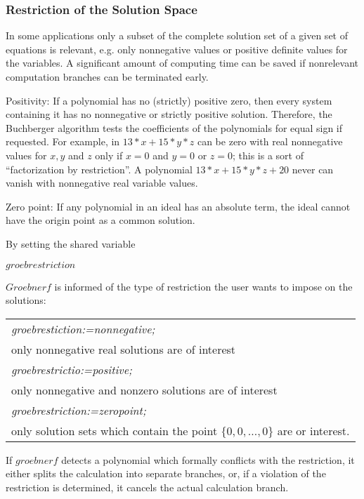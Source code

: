 \subsubsection{Restriction of the Solution Space}
In some applications only a subset of the complete solution set
of a given set of equations is relevant, e.g. only
nonnegative values or positive definite values for the variables.
A significant amount of computing time can be saved if
nonrelevant computation branches can be terminated early.

Positivity: If a polynomial has no (strictly) positive zero, then
every system containing it has no nonnegative or strictly positive
solution. Therefore, the Buchberger algorithm tests the coefficients of
the polynomials for equal sign if requested. For example, in $13*x +
15*y*z $ can be zero with real nonnegative values for $x, y$ and $z$
only if $x=0$ and $y=0$ or $ z=0$; this is a sort of ``factorization by
restriction''. A polynomial $13*x + 15*y*z + 20$ never can vanish
with nonnegative real variable values.

Zero point:  If any polynomial in an ideal has an absolute term, the ideal
cannot have the origin point as a common solution.

By setting the shared variable
\begin{center} $groebrestriction$ \end{center}
$Groebnerf$ is informed of the type of restriction the user wants to
impose on the solutions:
\begin{center}
\begin{tabular}{l}
{\it groebrestiction:=nonnegative;} \\
\hspace*{+.5cm} only nonnegative real solutions are of
interest\vspace*{4mm} \\
{\it groebrestrictio:=positive;} \\
\hspace*{+.5cm}only nonnegative and nonzero solutions are of
interest\vspace*{4mm} \\
{\it groebrestriction:=zeropoint;} \\
\hspace*{+.5cm}only solution sets which contain the point
$\{0,0,\ldots,0\}$ are or interest.
\end{tabular}
\end{center}

If $groebnerf$ detects a polynomial which formally conflicts with the
restriction, it either splits the calculation into separate branches, or,
if a violation of the restriction is determined, it cancels the actual
calculation branch.

